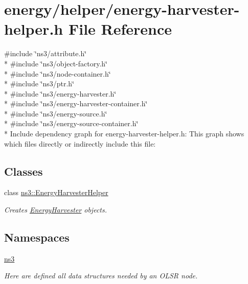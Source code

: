 \hypertarget{energy-harvester-helper_8h}{}\section{energy/helper/energy-\/harvester-\/helper.h File Reference}
\label{energy-harvester-helper_8h}
{\ttfamily \#include \char`\"{}ns3/attribute.\+h\char`\"{}}\\*
{\ttfamily \#include \char`\"{}ns3/object-\/factory.\+h\char`\"{}}\\*
{\ttfamily \#include \char`\"{}ns3/node-\/container.\+h\char`\"{}}\\*
{\ttfamily \#include \char`\"{}ns3/ptr.\+h\char`\"{}}\\*
{\ttfamily \#include \char`\"{}ns3/energy-\/harvester.\+h\char`\"{}}\\*
{\ttfamily \#include \char`\"{}ns3/energy-\/harvester-\/container.\+h\char`\"{}}\\*
{\ttfamily \#include \char`\"{}ns3/energy-\/source.\+h\char`\"{}}\\*
{\ttfamily \#include \char`\"{}ns3/energy-\/source-\/container.\+h\char`\"{}}\\*
Include dependency graph for energy-\/harvester-\/helper.h\+:
This graph shows which files directly or indirectly include this file\+:
\subsection*{Classes}
\begin{DoxyCompactItemize}
\item 
class \hyperlink{classns3_1_1EnergyHarvesterHelper}{ns3\+::\+Energy\+Harvester\+Helper}
\begin{DoxyCompactList}\small\item\em Creates \hyperlink{classns3_1_1EnergyHarvester}{Energy\+Harvester} objects. \end{DoxyCompactList}\end{DoxyCompactItemize}
\subsection*{Namespaces}
\begin{DoxyCompactItemize}
\item 
 \hyperlink{namespacens3}{ns3}
\begin{DoxyCompactList}\small\item\em Here are defined all data structures needed by an O\+L\+SR node. \end{DoxyCompactList}\end{DoxyCompactItemize}
